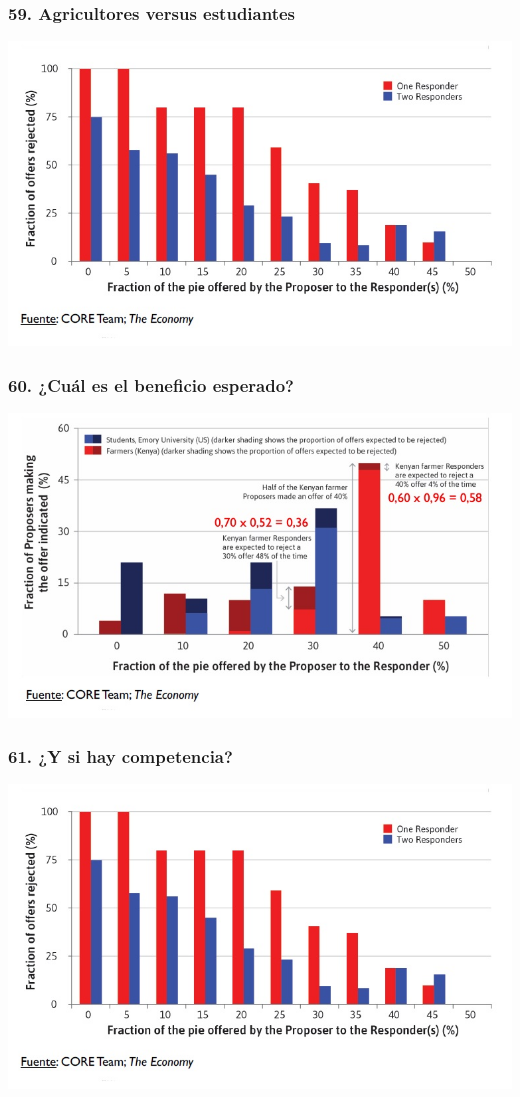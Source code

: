 \documentclass[14pt]{beamer}
\begin{document}
\begin{frame}
\frametitle{59. Agricultores versus estudiantes}
\centering
\includegraphics[scale=0.6]{Figures/Tema_03_32_ultimatum.jpg}
\end{frame}

\begin{frame}
\frametitle{60. ¿Cuál es el beneficio esperado?}
\centering
\includegraphics[scale=0.6]{Figures/Tema_03_31_ultimatum.jpg}
\end{frame}

\begin{frame}
\frametitle{61. ¿Y si hay competencia?}
\centering
\includegraphics[scale=0.6]{Figures/Tema_03_32_ultimatum.jpg}
\end{frame}
\end{document}

